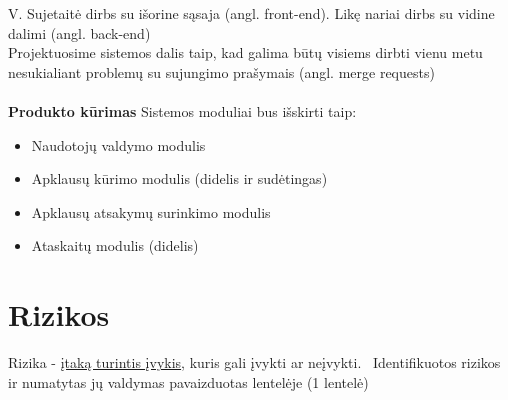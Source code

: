 \documentclass[11pt]{article}
\begin{document}
V. Sujetaitė dirbs su išorine sąsaja (angl. front-end).
Likę nariai dirbs su vidine dalimi (angl. back-end)\\

Projektuosime sistemos dalis taip, kad galima būtų visiems dirbti vienu metu nesukialiant problemų su sujungimo prašymais (angl. merge requests)\\
\\
\textbf{Produkto kūrimas}
Sistemos moduliai bus išskirti taip:
\begin{itemize}
	\item Naudotojų valdymo modulis
	\item Apklausų kūrimo modulis (didelis ir sudėtingas)
	\item Apklausų atsakymų surinkimo modulis
	\item Ataskaitų modulis (didelis)
\end{itemize}

\section{Rizikos}
Rizika - \underline{įtaką turintis įvykis}, kuris gali įvykti ar neįvykti.
\
Identifikuotos rizikos ir numatytas jų valdymas pavaizduotas lentelėje (1 lentelė)
\end{document}
